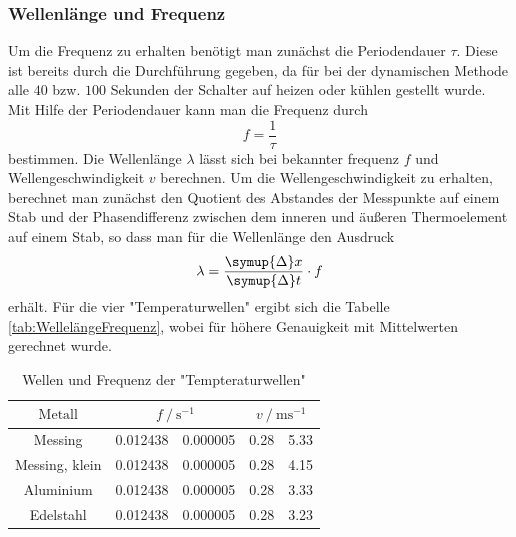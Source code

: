 \subsubsection{Wellenlänge und Frequenz}
Um die Frequenz zu erhalten benötigt man zunächst die Periodendauer $\tau$. Diese ist bereits durch die Durchführung gegeben,
da für bei der dynamischen Methode alle $40$ bzw. $100$ Sekunden der Schalter auf heizen oder kühlen gestellt wurde.
Mit Hilfe der Periodendauer kann man die Frequenz durch  
\begin{equation}
  f = \frac{1}{\tau}
\end{equation}  
bestimmen. Die Wellenlänge $\lambda$ lässt sich bei bekannter frequenz $f$ und Wellengeschwindigkeit $v$ berechnen. 
Um die Wellengeschwindigkeit zu erhalten, berechnet man zunächst den Quotient des Abstandes der Messpunkte auf einem Stab und der Phasendifferenz
zwischen dem inneren und äußeren Thermoelement auf einem Stab, so dass
man für die Wellenlänge den Ausdruck
\begin{equation}
  \lambda = \frac{\symup{\Delta} x }{\symup{\Delta} t }  \cdot f
\end{equation}
erhält. Für die vier "Temperaturwellen" ergibt sich die Tabelle \eqref{tab:WellelängeFrequenz}, wobei für höhere Genauigkeit mit Mittelwerten gerechnet wurde. 
\begin{table}
  \centering
  \label{tab:WellelängeFrequenz}
  \caption{Wellen und Frequenz der "Tempteraturwellen"}
  \begin{tabular}{
    S[table-format = 6]
    S[table-format = 1.6] @{${}\pm{}$} S[table-format = 1.6]
    S[table-format = 1.2] @{${}\pm{}$} S[table-format = 1.2]}
     \toprule
     $\text{Metall}$ &
      &
      \\
     \cmidrule(lr){2-3} \cmidrule(lr){4-5}
     \midrule
     {Messing}        & 0.012438 & 0.000005 & 0.28 & 5.33 \\
     {Messing, klein} & 0.012438 & 0.000005 & 0.28 & 4.15 \\
     {Aluminium}      & 0.012438 & 0.000005 & 0.28 & 3.33 \\
     {Edelstahl}      & 0.012438 & 0.000005 & 0.28 & 3.23 \\
      \bottomrule
  \end{tabular}
\end{table}